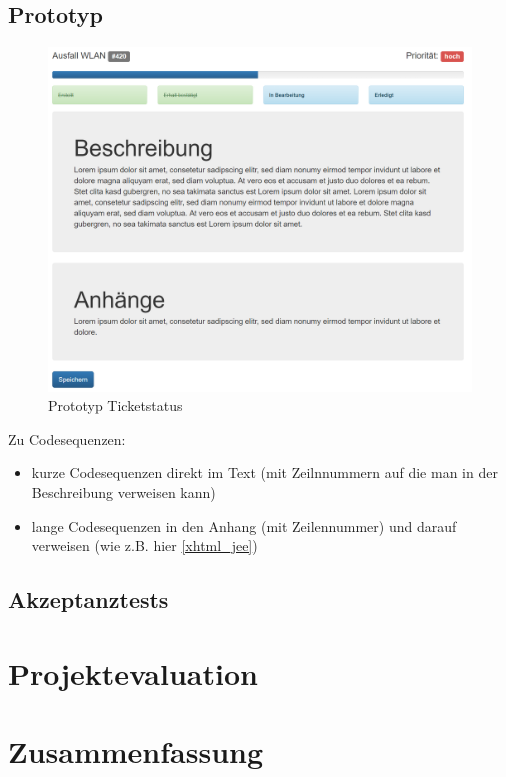 \section{Prototyp}
\begin{figure}[h]
	\centering
	\includegraphics[scale=.5]{figures/Prototyp.png}
	\caption{Prototyp Ticketstatus}
	\label{Abb_Prototyp_Ticketstatus}
\end{figure}



Zu Codesequenzen:
\begin{itemize}
	\item kurze Codesequenzen direkt im Text (mit Zeilnnummern auf die man in der Beschreibung verweisen kann)
	\item lange Codesequenzen in den Anhang (mit Zeilennummer) und darauf verweisen (wie z.B. hier \cref{xhtml_jee})
\end{itemize}

\section{Akzeptanztests}

\chapter{Projektevaluation}



\chapter{Zusammenfassung}
